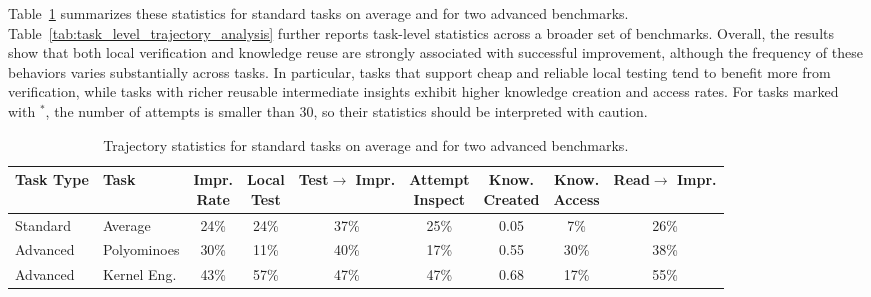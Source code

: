 Table~\ref{tab:single_agent_trajectory_analysis} summarizes these statistics for standard tasks on average and for two advanced benchmarks. Table~\ref{tab:task_level_trajectory_analysis} further reports task-level statistics across a broader set of benchmarks. Overall, the results show that both local verification and knowledge reuse are strongly associated with successful improvement, although the frequency of these behaviors varies substantially across tasks. In particular, tasks that support cheap and reliable local testing tend to benefit more from verification, while tasks with richer reusable intermediate insights exhibit higher knowledge creation and access rates. For tasks marked with $^{*}$, the number of attempts is smaller than 30, so their statistics should be interpreted with caution.

\begin{table}[h!]
\centering
\small
\setlength{\tabcolsep}{2.8pt}
\renewcommand{\arraystretch}{1.08}
\begin{tabular}{llccccccc}
\toprule
\textbf{Task Type} & \textbf{Task}
& \makecell[c]{\textbf{Impr.}\\\textbf{Rate}}
& \makecell[c]{\textbf{Local}\\\textbf{Test}}
& \makecell[c]{\textbf{Test$\rightarrow$}\\\textbf{Impr.}}
& \makecell[c]{\textbf{Attempt}\\\textbf{Inspect}}
& \makecell[c]{\textbf{Know.}\\\textbf{Created}}
& \makecell[c]{\textbf{Know.}\\\textbf{Access}}
& \makecell[c]{\textbf{Read$\rightarrow$}\\\textbf{Impr.}} \\
\midrule
Standard & Average      & 24\% & 24\% & 37\% & 25\% & 0.05 & 7\%  & 26\% \\
Advanced & Polyominoes  & 30\% & 11\% & 40\% & 17\% & 0.55 & 30\% & 38\% \\
Advanced & Kernel Eng.     & 43\% & 57\% & 47\% & 47\% & 0.68 & 17\% & 55\% \\
\bottomrule
\end{tabular}
\caption{Trajectory statistics for standard tasks on average and for two advanced benchmarks.}
\label{tab:single_agent_trajectory_analysis}
\end{table}

